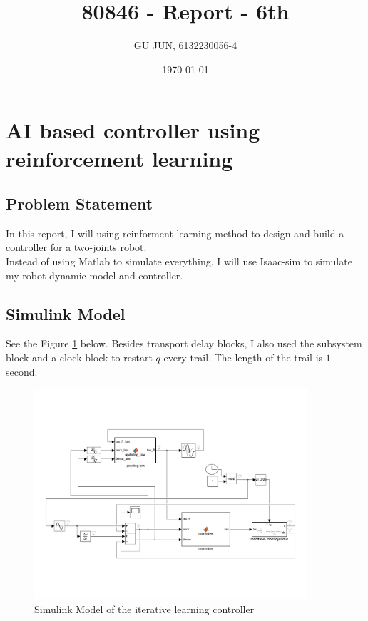 \documentclass{article}
\title{80846 - Report - 6th}
\author{GU JUN, 6132230056-4}
\date{\today}
\begin{document}
\maketitle


\section{\centering \Large AI based controller using reinforcement learning}

\subsection*{Problem Statement}

In this report, I will using reinforment learning method to design and build a controller for a two-joints robot.\\

Instead of using Matlab to simulate everything, I will use Isaac-sim to simulate my robot dynamic model and controller.\\

\subsection{Simulink Model}
See the Figure \ref{fig:model_ilc} below. Besides transport delay blocks, I also used the subsystem block and a clock block to restart $q$ every trail. The length of the trail is $1$ second.
\begin{figure}[ht]
    \centering
    \includegraphics[width=0.9\textwidth]{figures/model_ilc.pdf}
    \caption{Simulink Model of the iterative learning controller}
    \label{fig:model_ilc}
\end{figure}
\end{document}
